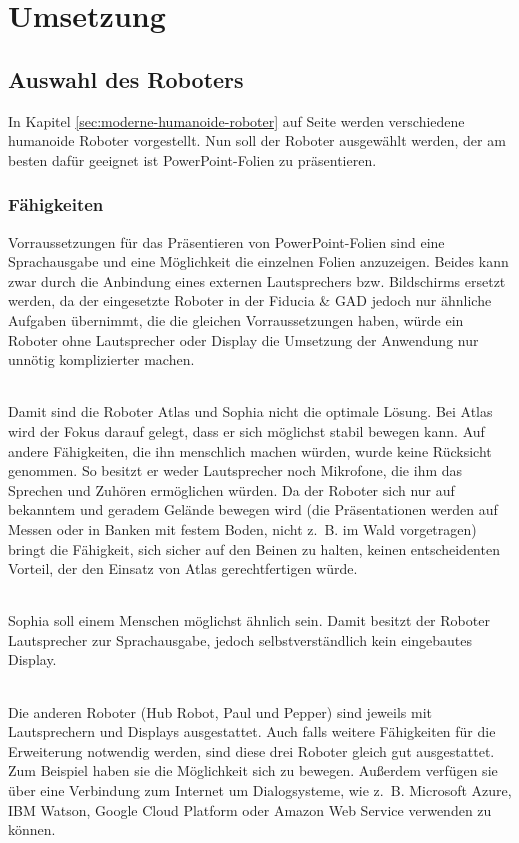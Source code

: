 \chapter{Umsetzung}\label{sec:umsetzung}
\section{Auswahl des Roboters}\label{sec:auswahl}
In Kapitel \ref{sec:moderne-humanoide-roboter} auf Seite
\pageref{sec:moderne-humanoide-roboter} werden verschiedene humanoide Roboter
vorgestellt. Nun soll der Roboter ausgewählt werden, der am besten dafür
geeignet ist PowerPoint-Folien zu präsentieren.

\subsection{Fähigkeiten}
Vorraussetzungen für das Präsentieren von PowerPoint-Folien sind eine
Sprachausgabe und eine Möglichkeit die einzelnen Folien anzuzeigen. Beides kann
zwar durch die Anbindung eines externen Lautsprechers bzw. Bildschirms ersetzt
werden, da der eingesetzte Roboter in der Fiducia \& GAD jedoch nur ähnliche
Aufgaben übernimmt, die die gleichen Vorraussetzungen haben, würde ein Roboter
ohne Lautsprecher oder Display die Umsetzung der Anwendung nur unnötig
komplizierter machen.

\subparagraph{}
Damit sind die Roboter Atlas und Sophia nicht die optimale Lösung. Bei Atlas
wird der Fokus darauf gelegt, dass er sich möglichst stabil bewegen kann. Auf
andere Fähigkeiten, die ihn menschlich machen würden, wurde keine Rücksicht
genommen. So besitzt er weder Lautsprecher noch Mikrofone, die ihm das Sprechen
und Zuhören ermöglichen würden. Da der Roboter sich nur auf bekanntem und
geradem Gelände bewegen wird (die Präsentationen werden auf Messen oder in
Banken mit festem Boden, nicht z.~B. im Wald vorgetragen) bringt die Fähigkeit,
sich sicher auf den Beinen zu halten, keinen entscheidenten Vorteil, der den
Einsatz von Atlas gerechtfertigen würde.

\subparagraph{}
Sophia soll einem Menschen möglichst ähnlich sein. Damit besitzt der Roboter
Lautsprecher zur Sprachausgabe, jedoch selbstverständlich kein eingebautes
Display.

\subparagraph{}
Die anderen Roboter (Hub Robot, Paul und Pepper) sind jeweils mit Lautsprechern
und Displays ausgestattet. Auch falls weitere Fähigkeiten für die Erweiterung
notwendig werden, sind diese drei Roboter gleich gut ausgestattet. Zum Beispiel
haben sie die Möglichkeit sich zu bewegen. Außerdem verfügen sie über eine
Verbindung zum Internet um Dialogsysteme, wie z.~B. Microsoft Azure, IBM Watson,
Google Cloud Platform oder Amazon Web Service verwenden zu können.

